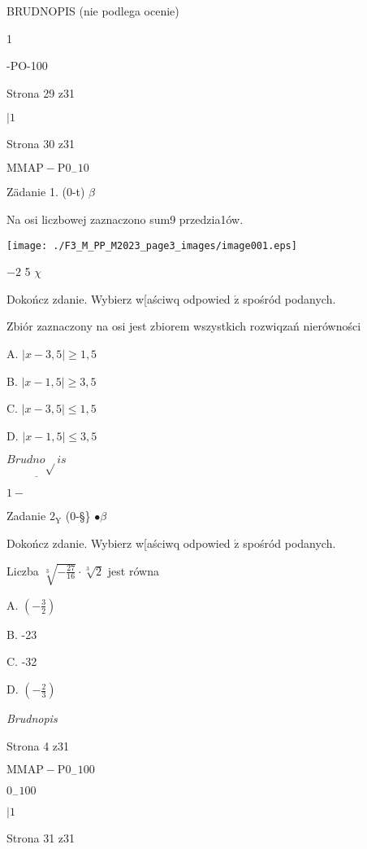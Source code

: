 \documentclass[a4paper,12pt]{article}
\begin{document}
BRUDNOPIS (nie podlega ocenie)

1

-PO-100

Strona 29 z31





$| 1$

Strona 30 z31

$\mathrm{M}\mathrm{M}\mathrm{A}\mathrm{P}-\mathrm{P}0_{-}10$





Zädanie 1. (0-t) $\beta$

Na osi liczbowej zaznaczono sum9 przedzia1ów.
\begin{center}
\texttt{[image: ./F3\_M\_PP\_M2023\_page3\_images/image001.eps]}
\end{center}
$-2$  5  $\chi$

Dokończ zdanie. Wybierz w[aściwq odpowied $\acute{\mathrm{z}}$ spośród podanych.

Zbiór zaznaczony na osi jest zbiorem wszystkich rozwiqzań nierówności

A. $|x-3,5|\geq 1,5$

B. $|x-1,5|\geq 3,5$

C. $|x-3,5|\leq 1,5$

D. $|x-1,5|\leq 3,5$

$\underline{Brudno\sqrt{}is}$

$1 -$

Zadanie $2_{\mathrm{Y}}$ (0-\S\} $\bullet \beta$

Dokończ zdanie. Wybierz w[aściwq odpowied $\acute{\mathrm{z}}$ spośród podanych.

Liczba $\sqrt[3]{-\frac{27}{16}}\cdot\sqrt[3]{2}$ jest równa

A. $(-\displaystyle \frac{3}{2})$

B. -23

C. -32

D. $(-\displaystyle \frac{2}{3})$

{\it Brudnopis}

Strona 4 z31

$\mathrm{M}\mathrm{M}\mathrm{A}\mathrm{P}-\mathrm{P}0_{-}100$





$0_{-}100$

$| 1$

Strona 31 z31
\end{document}
